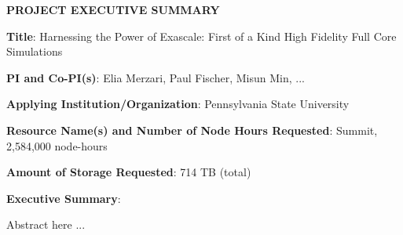 \documentclass[11pt,letterpaper,english]{article}
\begin{document}
\setlength{\parindent}{0in} %

\pagestyle{fancy}   \renewcommand{%
\headrulewidth}{0.0pt}

\begin{center}
\bf {PROJECT EXECUTIVE SUMMARY} \\
\end{center}



\bigskip

\textbf{Title}: Harnessing the Power of Exascale: First of a Kind High Fidelity Full Core Simulations \smallskip

\textbf{PI and Co-PI(s)}: Elia Merzari, Paul Fischer, Misun Min, ... \smallskip

\textbf{Applying Institution/Organization}: Pennsylvania State University \smallskip

\textbf{Resource Name(s) and Number of Node Hours Requested}: Summit, 2,584,000 node-hours \smallskip

\textbf{Amount of Storage Requested}: 714 TB (total) \smallskip

\textbf{Executive Summary}: \\

\vspace{.15in}

Abstract here ...

\end{document}
